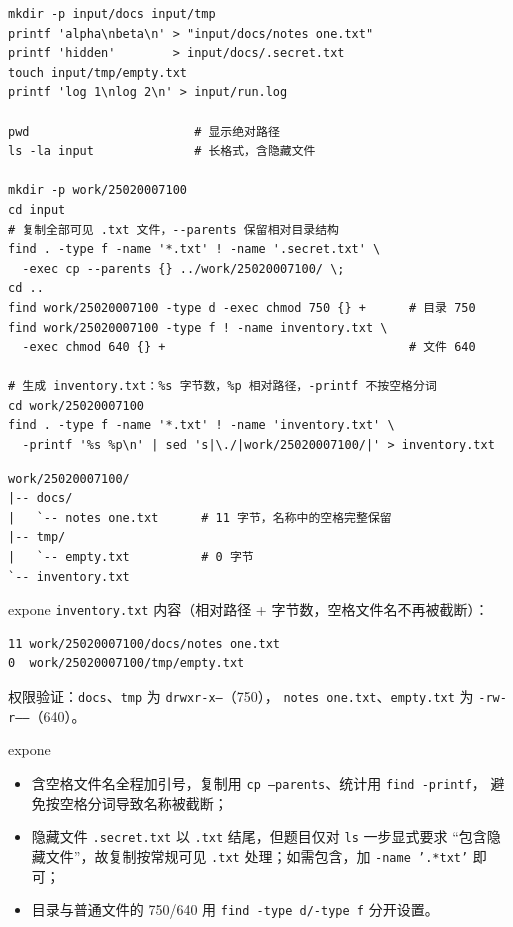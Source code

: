 \documentclass[11pt,a4paper,fontset=none]{ctexart}
\newcommand{\sublabel}[2]{%
  \par\vspace{1em}\noindent{\bfseries\color{#1!75!black}#2}\par\nobreak\vspace{0.25em}\noindent\ignorespaces
}
\begin{document}
\sublabel{expone}{\faTerminal\ 实现步骤}
\begin{lstlisting}[style=shell]
mkdir -p input/docs input/tmp
printf 'alpha\nbeta\n' > "input/docs/notes one.txt"
printf 'hidden'        > input/docs/.secret.txt
touch input/tmp/empty.txt
printf 'log 1\nlog 2\n' > input/run.log

pwd                       # 显示绝对路径
ls -la input              # 长格式，含隐藏文件

mkdir -p work/25020007100
cd input
# 复制全部可见 .txt 文件，--parents 保留相对目录结构
find . -type f -name '*.txt' ! -name '.secret.txt' \
  -exec cp --parents {} ../work/25020007100/ \;
cd ..
find work/25020007100 -type d -exec chmod 750 {} +      # 目录 750
find work/25020007100 -type f ! -name inventory.txt \
  -exec chmod 640 {} +                                  # 文件 640

# 生成 inventory.txt：%s 字节数，%p 相对路径，-printf 不按空格分词
cd work/25020007100
find . -type f -name '*.txt' ! -name 'inventory.txt' \
  -printf '%s %p\n' | sed 's|\./|work/25020007100/|' > inventory.txt
\end{lstlisting}

\sublabel{expone}{\faFolderOpen\ 目录结构}
\begin{lstlisting}[style=output]
work/25020007100/
|-- docs/
|   `-- notes one.txt      # 11 字节，名称中的空格完整保留
|-- tmp/
|   `-- empty.txt          # 0 字节
`-- inventory.txt
\end{lstlisting}

\begin{resbox}{expone}
\texttt{inventory.txt} 内容（相对路径 + 字节数，空格文件名不再被截断）：
\begin{lstlisting}[style=output]
11 work/25020007100/docs/notes one.txt
0  work/25020007100/tmp/empty.txt
\end{lstlisting}
权限验证：\texttt{docs}、\texttt{tmp} 为 \texttt{drwxr-x---}（750），
\texttt{notes one.txt}、\texttt{empty.txt} 为 \texttt{-rw-r-----}（640）。
\end{resbox}

\begin{trapbox}{expone}
\begin{itemize}[leftmargin=1.4em, itemsep=1pt]
  \item 含空格文件名全程加引号，复制用 \texttt{cp --parents}、统计用 \texttt{find -printf}，
        避免按空格分词导致名称被截断；
  \item 隐藏文件 \texttt{.secret.txt} 以 \texttt{.txt} 结尾，但题目仅对 \texttt{ls} 一步显式要求
        “包含隐藏文件”，故复制按常规可见 \texttt{.txt} 处理；如需包含，加
        \texttt{-name '.*txt'} 即可；
  \item 目录与普通文件的 750/640 用 \texttt{find -type d/-type f} 分开设置。
\end{itemize}
\end{trapbox}
\end{document}
